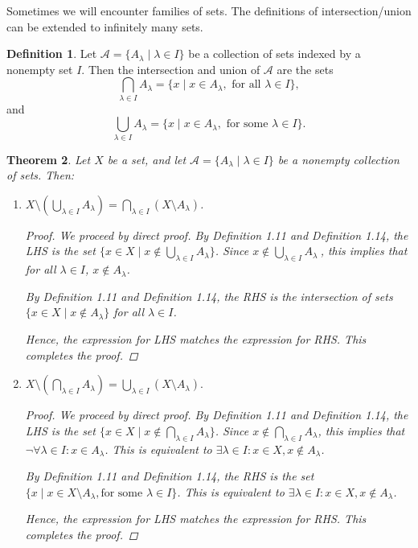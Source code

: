 \documentclass[11pt]{article}
\newtheorem{theorem}{Theorem}[section]
\theoremstyle{definition}
\newtheorem{definition}[theorem]{Definition}
\numberwithin{equation}{subsection}
\begin{document}
Sometimes we will encounter families of sets. The definitions of intersection/union can be extended to infinitely many sets. 


\begin{definition}

 Let $\mathcal{A}=\{A_\lambda\mid \lambda\in I\}$ be a collection of sets indexed by a nonempty set $I.$ Then the intersection and union of $\mathcal{A}$ are the sets
$$\bigcap_{\lambda\in I} A_\lambda =\{x\mid x\in A_\lambda, \text{ for all } \lambda\in I\},$$
and
$$\bigcup_{\lambda\in I}A_\lambda =\{x\mid x\in A_\lambda, \text{ for some }\lambda\in I\}.$$
\end{definition}

\begin{theorem}  
Let $X$ be a set, and let  $\mathcal{A}=\{A_\lambda\mid \lambda\in I\}$ be a nonempty collection of sets. Then:
\begin{enumerate}
\item
$X\setminus \left( \bigcup_{\lambda\in I}A_\lambda\right) =\bigcap_{\lambda\in I} (X\setminus A_\lambda)$.

\begin{proof}
We proceed by direct proof. By Definition 1.11 and Definition 1.14, the LHS is the set $\{x \in X \mid x \notin \bigcup_{\lambda\in I}A_\lambda\}$. Since $x \notin \bigcup_{\lambda\in I}A_\lambda\ $, this implies that for all $\lambda \in I$, $x \notin A_\lambda$.

By Definition 1.11 and Definition 1.14, the RHS is the intersection of sets $\{x \in X \mid x \notin A_\lambda \}$ for all $\lambda \in I$.

Hence, the expression for LHS matches the expression for RHS. This completes the proof.

\renewcommand\qedsymbol{QED}
\end{proof}

\item
$X\setminus \left( \bigcap_{\lambda\in I}A_\lambda\right)  =\bigcup_{\lambda\in I} (X\setminus A_\lambda).$

\begin{proof}
We proceed by direct proof. By Definition 1.11 and Definition 1.14, the LHS is the set $\{x \in X \mid x \notin \bigcap_{\lambda\in I}A_\lambda\}$. Since $x \notin \bigcap_{\lambda\in I}A_\lambda$, this implies that $\neg \forall \lambda \in I: x \in A_\lambda$. This is equivalent to $\exists \lambda \in I: x \in X, x \notin A_\lambda$.

By Definition 1.11 and Definition 1.14, the RHS is the set $\{x \mid x \in X \setminus A_\lambda, \text{for some } \lambda \in I \}$. This is equivalent to $\exists \lambda \in I : x \in X, x \notin A_\lambda$.

Hence, the expression for LHS matches the expression for RHS. This completes the proof.

\renewcommand\qedsymbol{QED}
\end{proof}
\end{enumerate}
\end{theorem}\medskip
\end{document}
